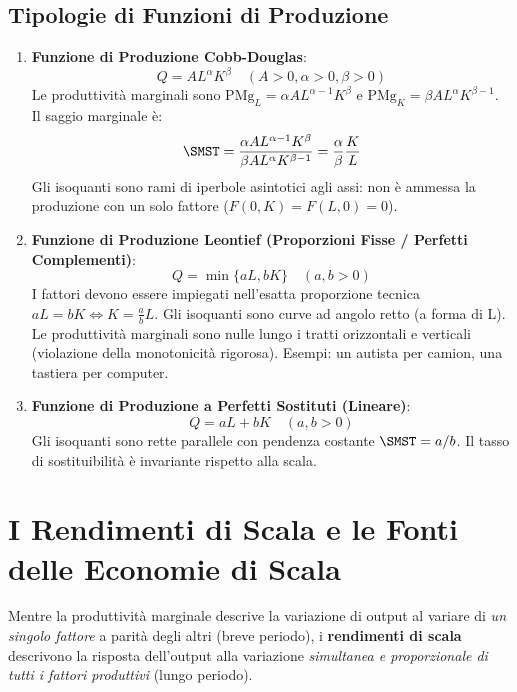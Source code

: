 \subsection{Tipologie di Funzioni di Produzione}
\begin{enumerate}
    \item \textbf{Funzione di Produzione Cobb-Douglas}:
    \begin{equation}
        Q = A L^\alpha K^\beta \quad (A > 0, \alpha > 0, \beta > 0)
    \end{equation}
    Le produttività marginali sono $\mathrm{PMg}_L = \alpha A L^{\alpha-1} K^\beta$ e $\mathrm{PMg}_K = \beta A L^\alpha K^{\beta-1}$. Il saggio marginale è:
    \begin{equation}
        \SMST = \frac{\alpha A L^{\alpha-1} K^\beta}{\beta A L^\alpha K^{\beta-1}} = \frac{\alpha}{\beta} \frac{K}{L}
    \end{equation}
    Gli isoquanti sono rami di iperbole asintotici agli assi: non è ammessa la produzione con un solo fattore ($F(0, K) = F(L, 0) = 0$).
    
    \item \textbf{Funzione di Produzione Leontief (Proporzioni Fisse / Perfetti Complementi)}:
    \begin{equation}
        Q = \min\{aL, bK\} \quad (a, b > 0)
    \end{equation}
    I fattori devono essere impiegati nell'esatta proporzione tecnica $aL = bK \iff K = \frac{a}{b} L$. Gli isoquanti sono curve ad angolo retto (a forma di L). Le produttività marginali sono nulle lungo i tratti orizzontali e verticali (violazione della monotonicità rigorosa). Esempi: un autista per camion, una tastiera per computer.
    
    \item \textbf{Funzione di Produzione a Perfetti Sostituti (Lineare)}:
    \begin{equation}
        Q = aL + bK \quad (a, b > 0)
    \end{equation}
    Gli isoquanti sono rette parallele con pendenza costante $\SMST = a/b$. Il tasso di sostituibilità è invariante rispetto alla scala.
\end{enumerate}

\section{I Rendimenti di Scala e le Fonti delle Economie di Scala}

Mentre la produttività marginale descrive la variazione di output al variare di \textit{un singolo fattore} a parità degli altri (breve periodo), i \textbf{rendimenti di scala} descrivono la risposta dell'output alla variazione \textit{simultanea e proporzionale di tutti i fattori produttivi} (lungo periodo).

